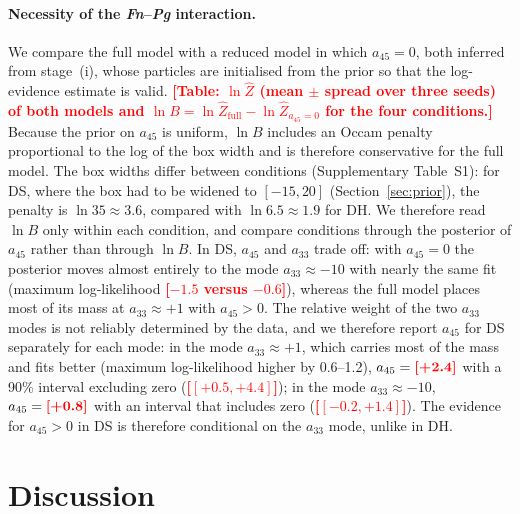 \documentclass[pdflatex,sn-mathphys-ay,lineno]{sn-jnl}%
\newcommand{\TBD}[1]{\textcolor{red}{\textbf{[#1]}}}
\begin{document}
\paragraph{Necessity of the \textit{Fn}--\textit{Pg} interaction.}
We compare the full model with a reduced model in which $a_{45}=0$, both inferred from stage~(i), whose particles are initialised from the prior so that the log-evidence estimate is valid.
\TBD{Table: $\ln\hat Z$ (mean $\pm$ spread over three seeds) of both models and $\ln B=\ln\hat Z_{\mathrm{full}}-\ln\hat Z_{a_{45}=0}$ for the four conditions.}
Because the prior on $a_{45}$ is uniform, $\ln B$ includes an Occam penalty proportional to the log of the box width and is therefore conservative for the full model. The box widths differ between conditions (Supplementary Table~S1): for DS, where the box had to be widened to $[-15,20]$ (Section~\ref{sec:prior}), the penalty is $\ln 35\approx3.6$, compared with $\ln 6.5\approx1.9$ for DH. We therefore read $\ln B$ only within each condition, and compare conditions through the posterior of $a_{45}$ rather than through $\ln B$. In DS, $a_{45}$ and $a_{33}$ trade off: with $a_{45}=0$ the posterior moves almost entirely to the mode $a_{33}\approx-10$ with nearly the same fit (maximum log-likelihood \TBD{$-1.5$ versus $-0.6$}), whereas the full model places most of its mass at $a_{33}\approx+1$ with $a_{45}>0$. The relative weight of the two $a_{33}$ modes is not reliably determined by the data, and we therefore report $a_{45}$ for DS separately for each mode: in the mode $a_{33}\approx+1$, which carries most of the mass and fits better (maximum log-likelihood higher by 0.6--1.2), $a_{45}=\TBD{+2.4}$ with a 90\% interval excluding zero (\TBD{$[+0.5,+4.4]$}); in the mode $a_{33}\approx-10$, $a_{45}=\TBD{+0.8}$ with an interval that includes zero (\TBD{$[-0.2,+1.4]$}). The evidence for $a_{45}>0$ in DS is therefore conditional on the $a_{33}$ mode, unlike in DH.

\section{Discussion}
\label{sec:discussion}
\end{document}
